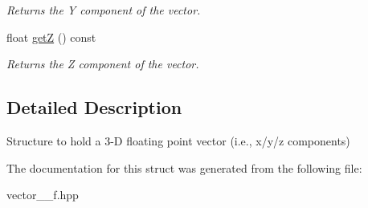 \begin{DoxyCompactItemize}
\begin{DoxyCompactList}\small\item\em Returns the Y component of the vector. \end{DoxyCompactList}\item 
float \hyperlink{structhebi_1_1Vector3f_a1e507447c4b55d14b137aa50c8f0bbf3}{getZ} () const \hypertarget{structhebi_1_1Vector3f_a1e507447c4b55d14b137aa50c8f0bbf3}{}\label{structhebi_1_1Vector3f_a1e507447c4b55d14b137aa50c8f0bbf3}

\begin{DoxyCompactList}\small\item\em Returns the Z component of the vector. \end{DoxyCompactList}\end{DoxyCompactItemize}


\subsection{Detailed Description}
Structure to hold a 3-\/D floating point vector (i.\+e., x/y/z components) 

The documentation for this struct was generated from the following file\+:\begin{DoxyCompactItemize}
\item 
vector\+\_\+\_\+f.\+hpp\end{DoxyCompactItemize}
